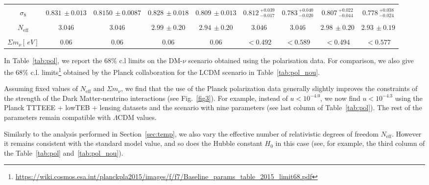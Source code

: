 \documentclass[aps,prd,a4paper,twocolumn,amsmath,showpacs,superscriptaddress,nofootinbib,preprintnumbers]{revtex4-1}
\newcommand{\neff}{N_{\mathrm{eff}}}
\newcommand{\mnu}{{\Sigma}m_{\nu}}
\begin{document}
\begin{table*}
\begin{center}
{\begin{tabular}{c|cccccccc}
\hspace{1mm}\\
$\sigma_8$ &$0.831\,\pm0.013$& $0.8150\,\pm0.0087$  & $0.828\,\pm0.018$& $0.809\,\pm0.013$ &$0.812\,_{-0.017}^{+0.039}$& $0.783\,^{+0.040}_{-0.020}$  & $0.807\,_{-0.044}^{+0.022}$& $0.778\,^{+0.038}_{-0.024}$ \\
\hspace{1mm}\\
$\neff$ &         $3.046$ &$3.046$& $2.99\,\pm0.20$ &$2.94\,\pm 0.20$&         $3.046$ &$3.046$ & $2.98\,\pm0.20$ &$2.93\,\pm 0.19$ \\
\hspace{1mm}\\
$\mnu [\, eV]$ &              $0.06$&$0.06$&$0.06$&$0.06$&$<0.492$&$<0.589$&$<0.494$&$<0.577$ \\
\hline
\end{tabular}}
\end{center}
\caption{$68\%$~CL constraints on cosmological parameters without interactions, for the Planck TTTEEE + lowTEB and the Planck TTTEEE + lowTEB + lensing combination of datasets. When only upper limits are shown, they correspond to 95\% c.l. limits.}
\label{tab:pol_nou}
\end{table*}


In Table~\ref{tab:pol}, we  report the $68 \% $ c.l  limits  on the DM-$\nu$ scenario obtained using the polarisation data. 
For comparison, we also give the $68 \% $ c.l.  limits\footnote{\url{https://wiki.cosmos.esa.int/planckpla2015/images/f/f7/Baseline_params_table_2015_limit68.pdf}}  
obtained by the Planck collaboration \cite{planck2015} for the LCDM scenario in Table~\ref{tab:pol_nou}.  

Assuming fixed values of $\neff$ and $\mnu$, we find that the use of the Planck polarization data generally slightly improves the constraints of the strength of the Dark Matter-neutrino interactions (see Fig.~\ref{fig3}). For example, instead of $u<10^{-4.0}$, we now find  $u< 10^{-4.3}$ using the Planck TTTEEE + lowTEB + lensing datasets and the scenario with nine parameters (see last column of Table~\ref{tab:pol}). The  rest of the parameters remain compatible with $\Lambda$CDM values.

Similarly to the analysis performed in Section~\ref{sec:temp}, we also vary the effective number of relativistic degrees of freedom $\neff$. However it remains consistent with the standard model value, and so does the Hubble constant $H_0$ in this case (see, for example, the third column of the Table~\ref{tab:pol} and~\ref{tab:pol_nou}). 
\end{document}
